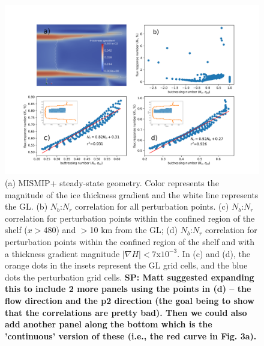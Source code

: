 \documentclass[tc, manuscript]{copernicus}
\begin{document}

\begin{figure}
\centering
\includegraphics[width=1\linewidth]{figs/mismip_Nb_GLF_regression.pdf}
    \caption{(a) MISMIP+ steady-state geometry. Color represents the magnitude of the ice thickness gradient and the white line represents the GL. (b) $N_b$:$N_r$ correlation for all perturbation points. (c) $N_b$:$N_r$ correlation for perturbation points within the confined region of the shelf ($x>480$) and $>$10 km from the GL; (d) $N_b$:$N_r$ correlation for perturbation points within the confined region of the shelf and with a thickness gradient magnitude $\left|\nabla H\right|<7$x$10^{-3}$. In (c) and (d), the orange dots in the insets represent the GL grid cells, and the blue dots the perturbation grid cells. \textbf{SP: Matt suggested expanding this to include 2 more panels using the points in (d) -- the flow direction and the p2 direction (the goal being to show that the correlations are pretty bad). Then we could also add another panel along the bottom which is the 'continuous' version of these (i.e., the red curve in Fig. 3a).}}
\label{mismip_Nb_GLF_regression}
\end{figure}
\end{document}
